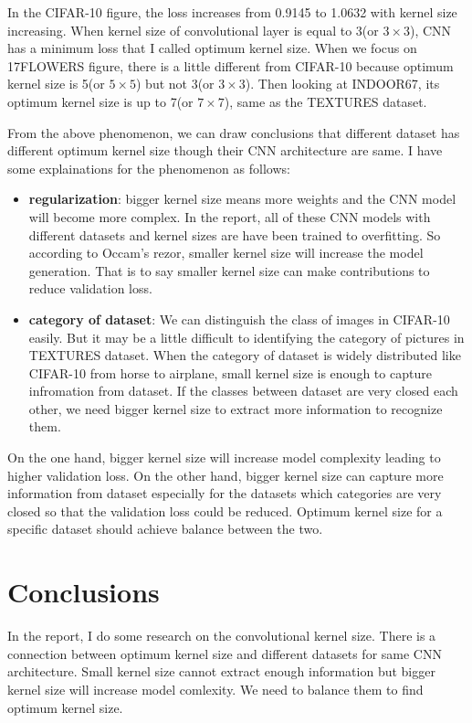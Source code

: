 \documentclass[a4paper,10pt]{article}
\begin{document}
In the CIFAR-10 figure, the loss increases from 0.9145 to 1.0632 with kernel size increasing. When kernel size of convolutional layer is equal to 3(or $3\times3$), CNN has a minimum loss that I called optimum kernel size. When we focus on 17FLOWERS figure, there is a little different from CIFAR-10 because optimum kernel size is 5(or $5\times5$) but not 3(or $3\times3$). Then looking at INDOOR67, its optimum kernel size is up to 7(or $7\times7$), same as the TEXTURES dataset.


From the above phenomenon, we can draw conclusions that different dataset has different optimum kernel size though their CNN architecture are same. I have some explainations for the phenomenon as follows:

   \begin{itemize}
      \item  \textbf{regularization}: bigger kernel size means more weights and the CNN model will become more complex. In the report, all of these CNN models with different datasets and kernel sizes are have been trained to overfitting. So according to Occam's rezor, smaller kernel size will increase the model generation. That is to say smaller kernel size can make contributions to reduce validation loss.
      \item  \textbf{category of dataset}:  We can distinguish the class of images in CIFAR-10 easily. But it may be a little difficult to identifying the category of pictures in TEXTURES dataset. When the category of dataset is widely distributed like CIFAR-10 from horse to airplane, small kernel size is enough to capture infromation from dataset. If the classes between dataset are very closed each other, we need bigger kernel size to extract more information to recognize them. 
   \end{itemize}


On the one hand, bigger kernel size will increase model complexity leading to higher validation loss. On the other hand, bigger kernel size can capture more information from dataset especially for the datasets which categories are very closed so that the validation loss could be reduced. Optimum kernel size for a specific dataset should achieve balance between the two.



\section{Conclusions}
In the report, I do some research on the convolutional kernel size. There is a connection between optimum kernel size and different datasets for same CNN architecture. Small kernel size cannot extract enough information but bigger kernel size will increase model comlexity. We need to balance them to find optimum kernel size.

\newpage

\renewcommand\refname{Reference}


\end{document}
